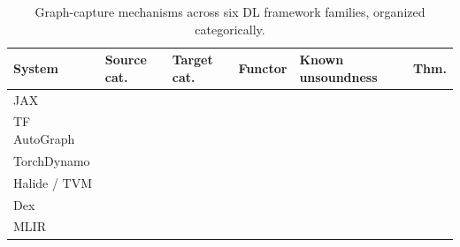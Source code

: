 \documentclass[11pt]{report}
\theoremstyle{definition}
\begin{document}
\begin{mainf}
\begin{table}[h]
    \centering
    \small
    \begin{tabular}{p{2.0cm}p{2.3cm}p{2.3cm}p{2.4cm}p{2.4cm}p{1.4cm}}
        \hline
        \textbf{System} & \textbf{Source cat.} & \textbf{Target cat.} & \textbf{Functor} & \textbf{Known unsoundness} & \textbf{Thm.} \\
        \hline
        JAX            & %
                       & %
                       & %
                       & %
                       & %
                       \\
        TF AutoGraph   & %
                       & %
                       & %
                       & %
                       & %
                       \\
        TorchDynamo    & %
                       & %
                       & %
                       & %
                       & %
                       \\
        Halide / TVM   & %
                       & %
                       & %
                       & %
                       & %
                       \\
        Dex            & %
                       & %
                       & %
                       & %
                       & %
                       \\
        MLIR           & %
                       & %
                       & %
                       & %
                       & %
                       \\
        \hline
    \end{tabular}
    \caption{Graph-capture mechanisms across six DL framework families,
    organized categorically.}
    \label{tab:comparison}
\end{table}




\end{mainf}
\end{document}
